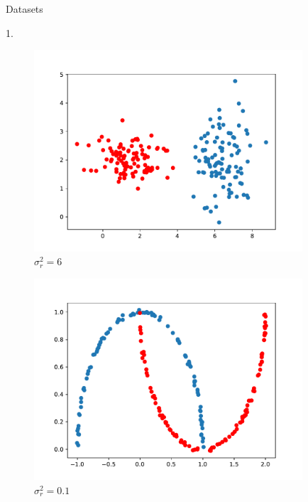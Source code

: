 \documentclass[english]{exercisesheet}
\author{Daniel Strenger, Lorenzo Minneci}
\begin{document}
 \makedocumentheader
  \begin{nexercise}{Datasets}
      \begin{solution} 1.
        \begin{figure}
        \centering
        \includegraphics[width=10cm]{simple.pdf}
        \caption{$\sigma_{r}^{2} = 6$}
        \end{figure}
        \begin{figure}
        \centering
        \cleardoublepage
        \includegraphics[width=10cm]{moon.pdf}
        \caption{$\sigma_{r}^{2} = 0.1$}
        \end{figure}
    \end{solution}
  
 \end{nexercise}
 
\end{document}

